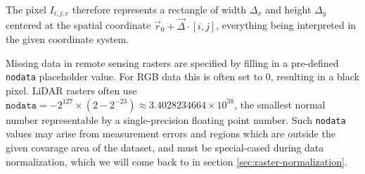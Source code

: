 The pixel $I_{i, j, c}$ therefore represents a rectangle of width $\Delta_x$ and height $\Delta_y$ centered at the spatial coordinate $\vec{r}_0 + \vec{\Delta} \cdot [i, j]$, everything being interpreted in the given coordinate system.

Missing data in remote sensing rasters are specified by filling in a pre-defined \texttt{nodata} placeholder value.
For RGB data this is often set to $0$, resulting in a black pixel.
LiDAR rasters often use $\texttt{nodata} = -2^{127} \times (2 - 2^{-23}) \approx 3.4028234664 \times 10^{38}$, the smallest normal number representable by a single-precision floating point number.
Such \texttt{nodata} values may arise from measurement errors and regions which are outside the given covarage area of the dataset, and must be special-cased during data normalization, which we will come back to in section \ref{sec:raster-normalization}.
